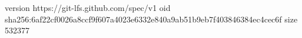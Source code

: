 version https://git-lfs.github.com/spec/v1
oid sha256:6af22cf0026a8ccf9f607a4023e6332e840a9ab51b9eb7f403846384ec4cec6f
size 532377
